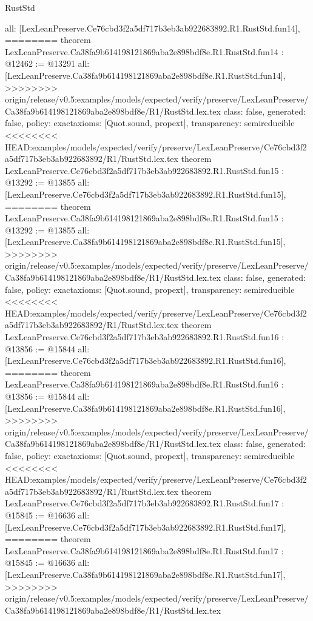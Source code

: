 \begin{lexlean}{RustStd}
\begin{coremodule}
{\begin{coremodule}
{{{{{{{{{{{{{{{{{  all: [LexLeanPreserve.Ce76cbd3f2a5df717b3eb3ab922683892.R1.RustStd.fun14],
========
theorem LexLeanPreserve.Ca38fa9b614198121869aba2e898bdf8e.R1.RustStd.fun14 : @12462 := @13291 {
  all: [LexLeanPreserve.Ca38fa9b614198121869aba2e898bdf8e.R1.RustStd.fun14],
>>>>>>>> origin/release/v0.5:examples/models/expected/verify/preserve/LexLeanPreserve/Ca38fa9b614198121869aba2e898bdf8e/R1/RustStd.lex.tex
  class: false,
  generated: false,
  policy: exact{axioms: [Quot.sound, propext]},
  transparency: semireducible
}
<<<<<<<< HEAD:examples/models/expected/verify/preserve/LexLeanPreserve/Ce76cbd3f2a5df717b3eb3ab922683892/R1/RustStd.lex.tex
theorem LexLeanPreserve.Ce76cbd3f2a5df717b3eb3ab922683892.R1.RustStd.fun15 : @13292 := @13855 {
  all: [LexLeanPreserve.Ce76cbd3f2a5df717b3eb3ab922683892.R1.RustStd.fun15],
========
theorem LexLeanPreserve.Ca38fa9b614198121869aba2e898bdf8e.R1.RustStd.fun15 : @13292 := @13855 {
  all: [LexLeanPreserve.Ca38fa9b614198121869aba2e898bdf8e.R1.RustStd.fun15],
>>>>>>>> origin/release/v0.5:examples/models/expected/verify/preserve/LexLeanPreserve/Ca38fa9b614198121869aba2e898bdf8e/R1/RustStd.lex.tex
  class: false,
  generated: false,
  policy: exact{axioms: [Quot.sound, propext]},
  transparency: semireducible
}
<<<<<<<< HEAD:examples/models/expected/verify/preserve/LexLeanPreserve/Ce76cbd3f2a5df717b3eb3ab922683892/R1/RustStd.lex.tex
theorem LexLeanPreserve.Ce76cbd3f2a5df717b3eb3ab922683892.R1.RustStd.fun16 : @13856 := @15844 {
  all: [LexLeanPreserve.Ce76cbd3f2a5df717b3eb3ab922683892.R1.RustStd.fun16],
========
theorem LexLeanPreserve.Ca38fa9b614198121869aba2e898bdf8e.R1.RustStd.fun16 : @13856 := @15844 {
  all: [LexLeanPreserve.Ca38fa9b614198121869aba2e898bdf8e.R1.RustStd.fun16],
>>>>>>>> origin/release/v0.5:examples/models/expected/verify/preserve/LexLeanPreserve/Ca38fa9b614198121869aba2e898bdf8e/R1/RustStd.lex.tex
  class: false,
  generated: false,
  policy: exact{axioms: [Quot.sound, propext]},
  transparency: semireducible
}
<<<<<<<< HEAD:examples/models/expected/verify/preserve/LexLeanPreserve/Ce76cbd3f2a5df717b3eb3ab922683892/R1/RustStd.lex.tex
theorem LexLeanPreserve.Ce76cbd3f2a5df717b3eb3ab922683892.R1.RustStd.fun17 : @15845 := @16636 {
  all: [LexLeanPreserve.Ce76cbd3f2a5df717b3eb3ab922683892.R1.RustStd.fun17],
========
theorem LexLeanPreserve.Ca38fa9b614198121869aba2e898bdf8e.R1.RustStd.fun17 : @15845 := @16636 {
  all: [LexLeanPreserve.Ca38fa9b614198121869aba2e898bdf8e.R1.RustStd.fun17],
>>>>>>>> origin/release/v0.5:examples/models/expected/verify/preserve/LexLeanPreserve/Ca38fa9b614198121869aba2e898bdf8e/R1/RustStd.lex.tex
}}}}}}}}}}}}}}}}}}}}}
\end{coremodule}}
\end{coremodule}
\end{lexlean}
